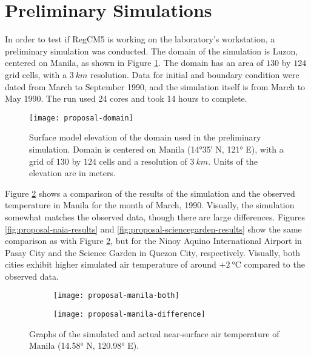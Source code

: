 \section{Preliminary Simulations}
	In order to test if RegCM5 is working on the laboratory's workstation,
		a preliminary simulation was conducted.
	The domain of the simulation is Luzon, centered on Manila, as shown in Figure \ref{fig:proposal-domain}.
	The domain has an area of $\num{130}$ by $\num{124}$ grid cells, with a $\qty{3}{km}$ resolution.
	Data for initial and boundary condition were dated from March to September 1990,
		and the simulation itself is from March to May 1990.
	The run used 24 cores and took 14 hours to complete.
		
	\begin{figure}
		\centering
		\texttt{[image: proposal-domain]}
		\caption{
			Surface model elevation of the domain used in the preliminary simulation.
			Domain is centered on Manila (\ang{14;35} N, \ang{121} E),
				with a grid of $\num{130}$ by $\num{124}$ cells
				and a resolution of $\qty{3}{km}$.
			Units of the elevation are in meters.
		}
		\label{fig:proposal-domain}
	\end{figure}
	
	Figure \ref{fig:proposal-manila-results} shows a comparison of the results of the simulation and the observed temperature in Manila for the month of March, 1990.
	Visually, the simulation somewhat matches the observed data, though there are large differences.
	Figures \ref{fig:proposal-naia-results} and \ref{fig:proposal-sciencegarden-results} show the same comparison as with Figure \ref{fig:proposal-manila-results}, 
		but for the Ninoy Aquino International Airport in Pasay City and the Science Garden in Quezon City, respectively.
	Visually, both cities exhibit higher simulated air temperature of around $+ \qty{2}{\degreeCelsius}$ compared to the observed data. 
	
	
	\begin{figure}
		\centering
		\begin{subfigure}{\textwidth}
			\texttt{[image: proposal-manila-both]}
		\end{subfigure}
		\begin{subfigure}{\textwidth}
			\texttt{[image: proposal-manila-difference]}
		\end{subfigure}
		\caption{
			Graphs of the simulated and actual near-surface air temperature of Manila (\ang{14.58} N, \ang{120.98} E).
		}
		\label{fig:proposal-manila-results}
	\end{figure}
	
